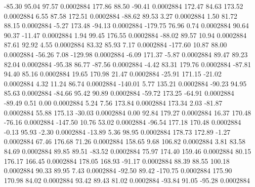       -85.30       95.04       97.57     0.0002884
      177.86       88.50      -90.41     0.0002884
      172.47       84.63      173.52     0.0002884
        6.55       87.58      172.51     0.0002884
      -88.62       89.53        3.27     0.0002884
        1.50       81.72       88.15     0.0002884
       -5.27      173.48      -94.13     0.0002884
     -179.75       76.96        0.74     0.0002884
       90.64       90.37      -11.47     0.0002884
        1.94       99.45      176.55     0.0002884
      -88.02       89.57       10.94     0.0002884
       87.61       92.92        4.55     0.0002884
       83.32       85.93        7.17     0.0002884
     -177.60       10.87       88.00     0.0002884
      -56.26        7.08     -129.98     0.0002884
       -6.09      171.37       -5.87     0.0002884
       89.47       89.23       82.04     0.0002884
      -95.38       86.77      -87.56     0.0002884
       -4.42       83.31      179.76     0.0002884
      -87.81       94.40       85.16     0.0002884
       19.65      170.98       21.47     0.0002884
      -25.91      171.15      -21.02     0.0002884
        4.32       11.24       86.74     0.0002884
     -140.01        5.77      135.21     0.0002884
      -90.23       94.95       85.63     0.0002884
      -84.66       95.42       90.89     0.0002884
      -59.72      173.25      -64.91     0.0002884
      -89.49        0.51        0.00     0.0002884
        5.24        7.56      173.84     0.0002884
      173.34        2.03      -81.87     0.0002884
       55.88      175.13      -30.03     0.0002884
        0.00       92.84      179.27     0.0002884
       16.37      170.48      -76.16     0.0002884
     -147.50       10.76       53.02     0.0002884
      -96.54      177.18      170.48     0.0002884
       -0.13       95.93       -2.30     0.0002884
      -13.89        5.36       98.95     0.0002884
      178.73      172.89       -1.27     0.0002884
       67.46      176.68       71.26     0.0002884
      158.65        9.68      106.82     0.0002884
        3.81       83.58       84.69     0.0002884
       89.85       89.51      -83.52     0.0002884
       75.97      174.40      159.46     0.0002884
       80.15      176.17      166.45     0.0002884
      178.05      168.93      -91.17     0.0002884
       88.39       88.55      100.18     0.0002884
       90.33       89.95        7.43     0.0002884
      -92.50       89.42     -170.75     0.0002884
      175.90      170.98       84.02     0.0002884
       93.42       89.43       81.02     0.0002884
      -93.84       91.05      -95.28     0.0002884

